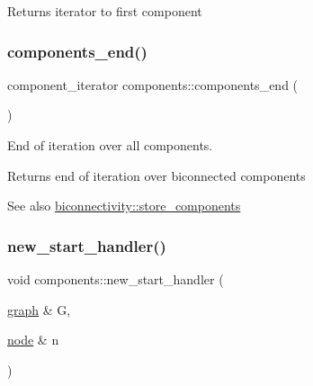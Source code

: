 \begin{DoxyReturn}{Returns}
iterator to first component 
\end{DoxyReturn}
\mbox{\label{classcomponents_a8537c6e4c6a29a4ae05a937b5fda1fb9}} 
\subsubsection{\texorpdfstring{components\+\_\+end()}{components\_end()}}
{\footnotesize\ttfamily component\+\_\+iterator components\+::components\+\_\+end (\begin{DoxyParamCaption}{ }\end{DoxyParamCaption})\hspace{0.3cm}{\ttfamily [inline]}}



End of iteration over all components. 

\begin{DoxyReturn}{Returns}
end of iteration over biconnected components 
\end{DoxyReturn}
\begin{DoxySeeAlso}{See also}
\mbox{\hyperlink{classbiconnectivity_a40e723d97cd42613470ab38baed18c78}{biconnectivity\+::store\+\_\+components}} 
\end{DoxySeeAlso}
\mbox{\label{classcomponents_af53365bd737b34cf63e4a6b10879ffcc}} 
\subsubsection{\texorpdfstring{new\+\_\+start\+\_\+handler()}{new\_start\_handler()}}
{\footnotesize\ttfamily void components\+::new\+\_\+start\+\_\+handler (\begin{DoxyParamCaption}\item[{\mbox{\hyperlink{classgraph}{graph}} \&}]{G,  }\item[{\mbox{\hyperlink{classnode}{node}} \&}]{n }\end{DoxyParamCaption})\hspace{0.3cm}{\ttfamily [virtual]}}



